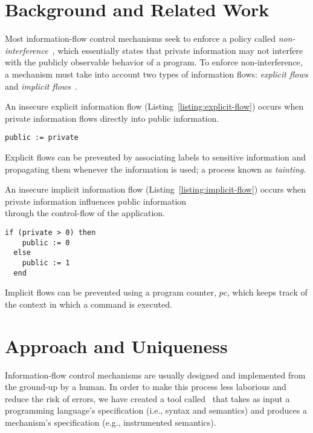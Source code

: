 \documentclass[sigplan,10pt]{acmart}\settopmatter{printfolios=true,printccs=false,printacmref=false}
\begin{document}
\section{Background and Related Work}\label{section:background}
Most information-flow control mechanisms seek to enforce a policy called \emph{non-interference}~\cite{DBLP:conf/sp/GoguenM82a}, which essentially states that private information may not interfere with the publicly observable behavior of a program. To enforce non-interference, a mechanism must take into account two types of information flows: \emph{explicit flows} and \emph{implicit flows}~\cite{DBLP:journals/cacm/Denning76}. 

An insecure explicit information flow (Listing~\ref{listing:explicit-flow}) occurs when private information flows directly into public information. 
\begin{lstlisting}[captionpos=b, caption=Insecure explicit flow, label=listing:explicit-flow]
  public := private
\end{lstlisting}
Explicit flows can be prevented by associating labels to sensitive information and propagating them whenever the information is used; a process known as \emph{tainting}.

An insecure implicit information flow (Listing~\ref{listing:implicit-flow}) occurs when private information influences public information\\through the control-flow of the application.
\pagebreak
\begin{lstlisting}[captionpos=b, caption=Insecure implicit flow, label=listing:implicit-flow]
  if (private > 0) then
    public := 0
  else
    public := 1
  end
\end{lstlisting}
Implicit flows can be prevented using a program counter, $pc$, which keeps track of the context in which a command is executed.

\section{Approach and Uniqueness}
Information-flow control mechanisms are usually designed and implemented from the ground-up by a human. In order to make this process less laborious and reduce the risk of errors, we have created a tool called \ottifc\ that takes as input a programming language's specification (i.e., syntax and semantics) and produces a mechanism's specification (e.g., instrumented semantics). 
\end{document}
